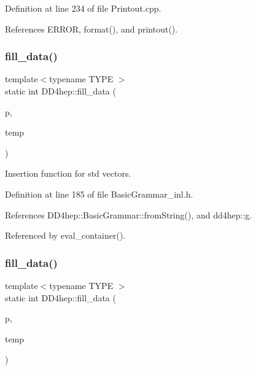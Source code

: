 Definition at line 234 of file Printout.\+cpp.



References E\+R\+R\+OR, format(), and printout().

\hypertarget{namespace_d_d4hep_a887792556fa340057530033b0467e8be}{}\label{namespace_d_d4hep_a887792556fa340057530033b0467e8be} 
\subsubsection{\texorpdfstring{fill\+\_\+data()}{fill\_data()}\hspace{0.1cm}{\footnotesize\ttfamily [1/5]}}
{\footnotesize\ttfamily template$<$typename T\+Y\+PE $>$ \\
static int D\+D4hep\+::fill\+\_\+data (\begin{DoxyParamCaption}\item[{std\+::vector$<$ T\+Y\+PE $>$ $\ast$}]{p,  }\item[{const std\+::vector$<$ std\+::string $>$ \&}]{temp }\end{DoxyParamCaption})\hspace{0.3cm}{\ttfamily [static]}}



Insertion function for std vectors. 



Definition at line 185 of file Basic\+Grammar\+\_\+inl.\+h.



References D\+D4hep\+::\+Basic\+Grammar\+::from\+String(), and dd4hep\+::g.



Referenced by eval\+\_\+container().

\hypertarget{namespace_d_d4hep_a7951dcea565f2769f43461443601de15}{}\label{namespace_d_d4hep_a7951dcea565f2769f43461443601de15} 
\subsubsection{\texorpdfstring{fill\+\_\+data()}{fill\_data()}\hspace{0.1cm}{\footnotesize\ttfamily [2/5]}}
{\footnotesize\ttfamily template$<$typename T\+Y\+PE $>$ \\
static int D\+D4hep\+::fill\+\_\+data (\begin{DoxyParamCaption}\item[{std\+::list$<$ T\+Y\+PE $>$ $\ast$}]{p,  }\item[{const std\+::vector$<$ std\+::string $>$ \&}]{temp }\end{DoxyParamCaption})\hspace{0.3cm}{\ttfamily [static]}}



